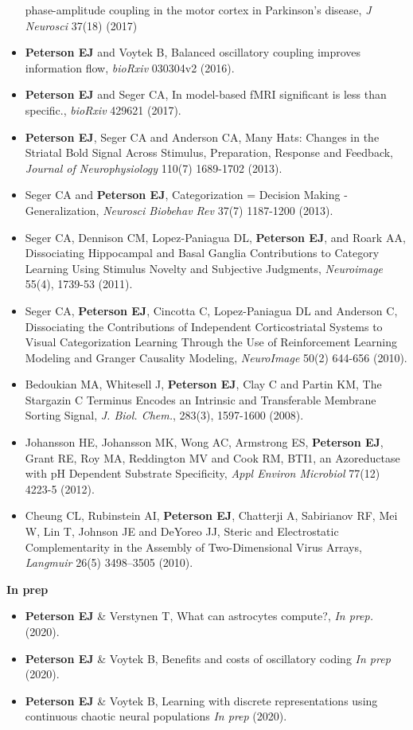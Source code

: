 \begin{itemize}
  phase-amplitude coupling in the motor cortex in Parkinson's disease,
  \emph{J Neurosci} 37(18) (2017)
\item
  \textbf{Peterson EJ} and Voytek B, Balanced oscillatory coupling
  improves information flow, \emph{bioRxiv} 030304v2 (2016).
\item
  \textbf{Peterson EJ} and Seger CA, In model-based fMRI significant is
  less than specific., \emph{bioRxiv} 429621 (2017).
\item
  \textbf{Peterson EJ}, Seger CA and Anderson CA, Many Hats: Changes in
  the Striatal Bold Signal Across Stimulus, Preparation, Response and
  Feedback, \emph{Journal of Neurophysiology} 110(7) 1689-1702 (2013).
\item
  Seger CA and \textbf{Peterson EJ}, Categorization = Decision Making -
  Generalization, \emph{Neurosci Biobehav Rev} 37(7) 1187-1200 (2013).
\item
  Seger CA, Dennison CM, Lopez-Paniagua DL, \textbf{Peterson EJ}, and
  Roark AA, Dissociating Hippocampal and Basal Ganglia Contributions to
  Category Learning Using Stimulus Novelty and Subjective Judgments,
  \emph{Neuroimage} 55(4), 1739-53 (2011).
\item
  Seger CA, \textbf{Peterson EJ}, Cincotta C, Lopez-Paniagua DL and
  Anderson C, Dissociating the Contributions of Independent
  Corticostriatal Systems to Visual Categorization Learning Through the
  Use of Reinforcement Learning Modeling and Granger Causality Modeling,
  \emph{NeuroImage} 50(2) 644-656 (2010).
\item
  Bedoukian MA, Whitesell J, \textbf{Peterson EJ}, Clay C and Partin KM,
  The Stargazin C Terminus Encodes an Intrinsic and Transferable
  Membrane Sorting Signal, \emph{J. Biol. Chem.}, 283(3), 1597-1600
  (2008).
\item
  Johansson HE, Johansson MK, Wong AC, Armstrong ES, \textbf{Peterson
  EJ}, Grant RE, Roy MA, Reddington MV and Cook RM, BTI1, an
  Azoreductase with pH Dependent Substrate Specificity, \emph{Appl
  Environ Microbiol} 77(12) 4223-5 (2012).
\item
  Cheung CL, Rubinstein AI, \textbf{Peterson EJ}, Chatterji A,
  Sabirianov RF, Mei W, Lin T, Johnson JE and DeYoreo JJ, Steric and
  Electrostatic Complementarity in the Assembly of Two-Dimensional Virus
  Arrays, \emph{Langmuir} 26(5) 3498--3505 (2010).
\end{itemize}

\textbf{In prep}

\begin{itemize}
\item
  \textbf{Peterson EJ} \& Verstynen T, What can astrocytes compute?,
  \emph{In prep.} (2020).
\item
  \textbf{Peterson EJ} \& Voytek B, Benefits and costs of oscillatory
  coding \emph{In prep} (2020).
\item
  \textbf{Peterson EJ} \& Voytek B, Learning with discrete
  representations using continuous chaotic neural populations \emph{In
  prep} (2020).
\end{itemize}

